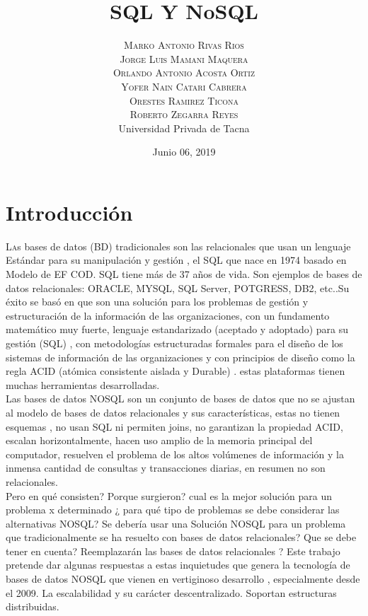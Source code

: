 \documentclass[twoside,twocolumn]{article}
\title{SQL Y NoSQL} %
\author{%
\textsc{Marko Antonio Rivas Rios} \\[1ex] %
\textsc{Jorge Luis Mamani Maquera} \\[1.01ex] %
\textsc{Orlando Antonio Acosta Ortiz} \\[1.02ex] %
\textsc{Yofer Nain Catari Cabrera} \\[1.03ex] %
\textsc{Orestes Ramirez Ticona} \\[1.04ex] %
\textsc{Roberto Zegarra Reyes} \\[1.05ex] %
\normalsize Universidad Privada de Tacna \\  %
\normalsize {} %
}
\date{Junio 06, 2019} %
\begin{document}
\maketitle


\section{Introducción}

\lettrine[nindent=0em,lines=2]{L}as bases de datos (BD) tradicionales son las relacionales que usan un lenguaje Estándar para su manipulación y gestión , el SQL que nace en 1974 basado en Modelo de EF COD. SQL tiene más de 37 años de vida. Son ejemplos de bases de datos relacionales: ORACLE, MYSQL, SQL Server, POTGRESS, DB2, etc..Su éxito se basó en que son una solución para los problemas de gestión y estructuración  de la información  de las organizaciones, con un fundamento matemático muy fuerte, lenguaje estandarizado (aceptado y adoptado)  para su gestión (SQL) , con metodologías estructuradas formales para el diseño de los sistemas de información de las organizaciones y con principios de diseño  como la regla ACID (atómica consistente aislada y Durable) . estas plataformas tienen muchas herramientas desarrolladas.\textbf{}\\
Las bases de datos NOSQL son un conjunto de bases de datos que no se ajustan al modelo de bases de datos relacionales y sus características, estas no tienen esquemas  , no usan SQL ni permiten joins, no garantizan la propiedad ACID,  escalan horizontalmente, hacen uso amplio de la memoria principal del computador, resuelven el problema de los altos volúmenes de información y la inmensa cantidad de consultas y transacciones diarias, en resumen no son relacionales.\textbf{}\\
Pero en qué consisten? Porque surgieron? cual es la mejor solución para un problema x determinado ¿ para qué tipo de problemas se debe considerar las alternativas NOSQL? Se debería usar una Solución NOSQL para un problema que tradicionalmente se ha resuelto con bases de datos relacionales? Que se debe tener en cuenta? Reemplazarán las bases de datos relacionales ?
Este trabajo pretende dar algunas respuestas a estas inquietudes que genera la tecnología de bases de datos NOSQL que vienen en vertiginoso desarrollo , especialmente desde el 2009. La escalabilidad y su carácter descentralizado. Soportan estructuras distribuidas.
\end{document}
